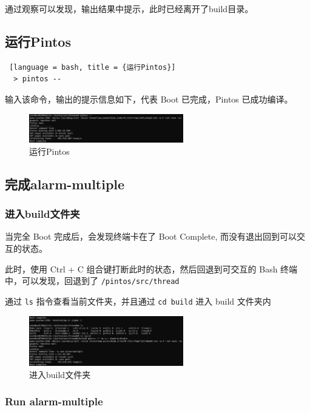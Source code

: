 通过观察可以发现，输出结果中提示，此时已经离开了build目录。

\subsection{运行Pintos}
\begin{lstlisting} [language = bash, title = {运行Pintos}]
  > pintos --
\end{lstlisting}

输入该命令，输出的提示信息如下，代表 Boot 已完成，Pintos 已成功编译。

\begin{figure} [H]
  \centering
  \includegraphics[width=0.6\textwidth]{img1/Boot.png}
  \caption{运行Pintos}
  \label{fig:pintosboot}
\end{figure}

\subsection{完成alarm-multiple}

\subsubsection{进入build文件夹}

当完全 Boot 完成后，会发现终端卡在了 Boot Complete, 而没有退出回到可以交互的状态。

此时，使用 Ctrl + C 组合键打断此时的状态，然后回退到可交互的 Bash 终端中，可以发现，回退到了 \texttt{/pintos/src/thread}

通过 \texttt{ls} 指令查看当前文件夹，并且通过 \texttt{cd build} 进入 build 文件夹内

\begin{figure} [H]
  \centering
  \includegraphics[width=0.6\textwidth]{img1/CtrlC.png}
  \caption{进入build文件夹}
  \label{fig:build}
\end{figure}

\subsubsection{Run alarm-multiple}

